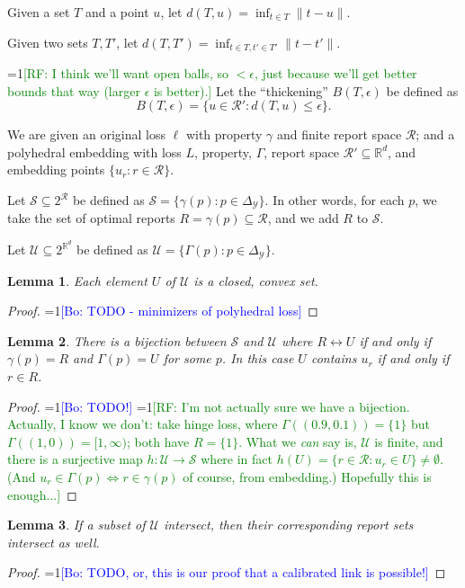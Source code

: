 \documentclass{article}
\newcommand{\Comments}{1}
\newcommand{\mynote}[2]{\ifnum\Comments=1\textcolor{#1}{#2}\fi}
\newcommand{\raf}[1]{\mynote{green}{[RF: #1]}}
\newcommand{\bo}[1]{\mynote{blue}{[Bo: #1]}}
\newcommand{\reals}{\mathbb{R}}
\newcommand{\R}{\mathcal{R}}
\newcommand{\Y}{\mathcal{Y}}
\newtheorem{lemma}{Lemma}
\begin{document}
Given a set $T$ and a point $u$, let $d(T,u) = \inf_{t \in T} \|t-u\|$.

Given two sets $T,T'$, let $d(T,T') = \inf_{t\in T, t' \in T'} \|t-t'\|$.

\raf{I think we'll want open balls, so $< \epsilon$, just because we'll get better bounds that way (larger $\epsilon$ is better).}
Let the ``thickening'' $B(T,\epsilon)$ be defined as
  \[ B(T,\epsilon) = \{u \in \R' : d(T,u) \leq \epsilon \} . \]

We are given an original loss $\ell$ with property $\gamma$ and finite report space $\R$; and a polyhedral embedding with loss $L$, property, $\Gamma$, report space $\R' \subseteq \reals^d$, and embedding points $\{u_r : r \in \R\}$.


Let $\mathcal{S} \subseteq 2^{\R}$ be defined as $\mathcal{S} = \{\gamma(p) : p \in \Delta_{\Y}\}$.
In other words, for each $p$, we take the set of optimal reports $R = \gamma(p) \subseteq \R$, and we add $R$ to $\mathcal{S}$.

Let $\mathcal{U} \subseteq 2^{\reals^d}$ be defined as $\mathcal{U} = \{\Gamma(p) : p \in \Delta_{\Y}\}$.

\begin{lemma} \label{lemma:U-convex-closed}
  Each element $U$ of $\mathcal{U}$ is a closed, convex set.
\end{lemma}
\begin{proof}
  \bo{TODO - minimizers of polyhedral loss}
\end{proof}

\begin{lemma} \label{lemma:U-biject}
  There is a bijection between $\mathcal{S}$ and $\mathcal{U}$ where $R \leftrightarrow U$ if and only if $\gamma(p) = R$ and $\Gamma(p) = U$ for some $p$.
  In this case $U$ contains $u_r$ if and only if $r \in R$.
\end{lemma}
\begin{proof}
  \bo{TODO!}
  \raf{I'm not actually sure we have a bijection.  Actually, I know we don't: take hinge loss, where $\Gamma((0.9,0.1)) = \{1\}$ but $\Gamma((1,0)) = [1,\infty)$; both have $R = \{1\}$.  What we \emph{can} say is, $\mathcal{U}$ is finite, and there is a surjective map $h:\mathcal{U}\to\mathcal{S}$ where in fact $h(U) = \{r\in\R : u_r \in U\} \neq \emptyset$.  (And $u_r \in \Gamma(p) \iff r \in \gamma(p)$ of course, from embedding.)  Hopefully this is enough...}
\end{proof}

\begin{lemma} \label{lemma:calibrated-pos}
  If a subset of $\mathcal{U}$ intersect, then their corresponding report sets intersect as well.
\end{lemma}
\begin{proof}
  \bo{TODO, or, this is our proof that a calibrated link is possible!}
\end{proof}
\end{document}
